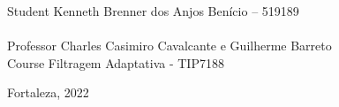 \vspace{25pt}

\begin{flushleft}
	\begin{tabbing}
		Student \qquad Kenneth Brenner dos Anjos Benício – 519189\\
	   \qquad\qquad\qquad\= \\
		Professor\> Charles Casimiro Cavalcante e Guilherme Barreto\\
		Course \> Filtragem Adaptativa - TIP7188\\
	\end{tabbing}
\end{flushleft}

\vspace{25pt}

\begin{center}
    Fortaleza, 2022
\end{center}
